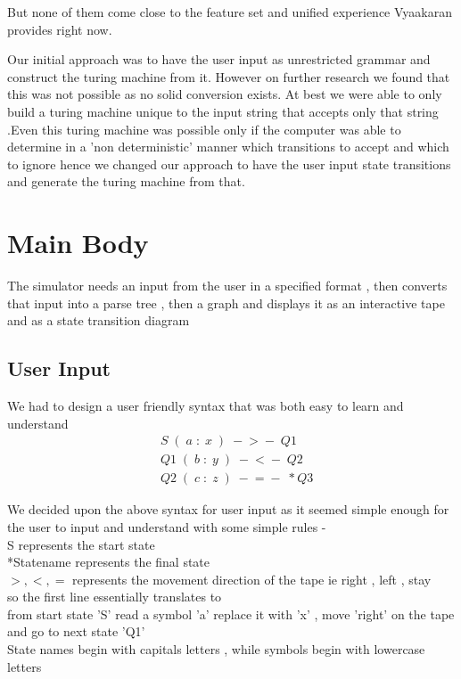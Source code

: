 \documentclass[12pt]{report}
\begin{document}
But none of them come close to the feature set and unified experience
Vyaakaran provides right now.

Our initial approach was to have the user input as unrestricted grammar and construct the turing machine from it. However on further research we found that this was not possible as no solid conversion exists. At best we were able to only build a turing machine unique to the input string that accepts only that string .Even this turing machine was possible only if the computer was able to determine in a 'non deterministic' manner which transitions to accept and which to ignore
hence we changed our approach to have the user input state transitions and generate the turing machine from that.
\cite{wiki:tm1}
\cite{wiki:tm2}
\cite{wiki:tm3}
\cite{wiki:tm4}
\cite{wiki:tm5}

\chapter{Main Body}

The simulator needs an input from the user in a specified format , then converts that input into a parse tree , then a graph and displays it as an interactive tape and as a state transition diagram

\section{User Input}
We had to design a user friendly syntax that was both easy to learn and understand
\begin{align*}
 &S \; ( \;a \;: \;x \;) \;-\!>\!- \;Q1 \\
 &Q1 \;(\; b\; :\; y \;)\; -\!<\!- \;Q2 \\
 &Q2 \;(\; c \;: \;z \;) \; -\!=\!- \; *Q3 
\end{align*}

We decided upon the above syntax for user input as it seemed simple enough for the user to input and understand with some simple rules -\\
S represents the start state \\
*Statename represents the final state\\
$ >,<,= $ represents the movement direction of the tape ie right , left , stay \\
so the first line essentially translates to \\ 
from start state 'S' read a symbol 'a' replace it with 'x' , move 'right' on the tape and go to next state 'Q1'\\
State names begin with capitals letters , while symbols begin with lowercase letters
\end{document}
